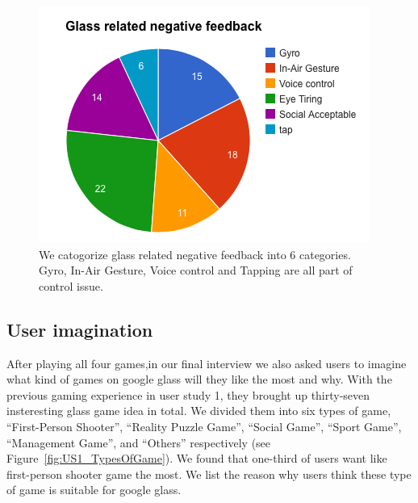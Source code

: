 \begin{figure}[!t]
\centering
\includegraphics[width=0.9\columnwidth]{Figures/US1_userfeedbackStatistics.png}
\caption{We catogorize glass related negative feedback into 6 categories. Gyro, In-Air Gesture, Voice control and Tapping are all part of control issue.}
\label{fig:negativeFeedback}
\end{figure}




\subsection{User imagination}
After playing all four games,in our final interview we also asked users to imagine what kind of games on google glass will they like the most and why. With the previous gaming experience in user study 1, they brought up thirty-seven insteresting glass game idea in total. We divided them into six types of game, ``First-Person Shooter'', ``Reality Puzzle Game'', ``Social Game'', ``Sport Game'', ``Management Game'', and ``Others'' respectively (see Figure~\ref{fig:US1_TypesOfGame}). We found that one-third of users want like first-person shooter game the most. We list the reason why users think these type of game is suitable for google glass.

